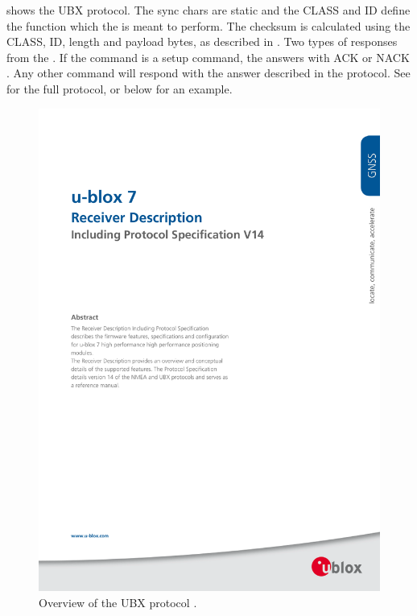  shows the UBX protocol.
The sync chars are static and the CLASS and ID define the function which the \GPS is meant to perform.
The checksum is calculated using the CLASS, ID, length and payload bytes, as described in \cite[p.~74]{NEO7_proto}.
Two types of responses from the \GPS.
If the command is a setup command, the \GPS answers with ACK or NACK \cite[p.~80]{NEO7_proto}.
Any other command will respond with the answer described in the protocol.
See \cite[p.~73-183]{NEO7_proto} for the full protocol, or below for an example.

\begin{figure}
	\centering
	\includegraphics[page=86, width=\textwidth,  clip, trim={2cm, 14cm, 2cm, 10cm}]{Appendix/Datasheets/u-blox7-V14_ReceiverDescrProtSpec_(GPS-G7-SW-12001)_Public.pdf}
	\caption{Overview of the UBX protocol \cite[p.~73]{NEO7_proto}.}
	\label{fig:UBX}
\end{figure}

